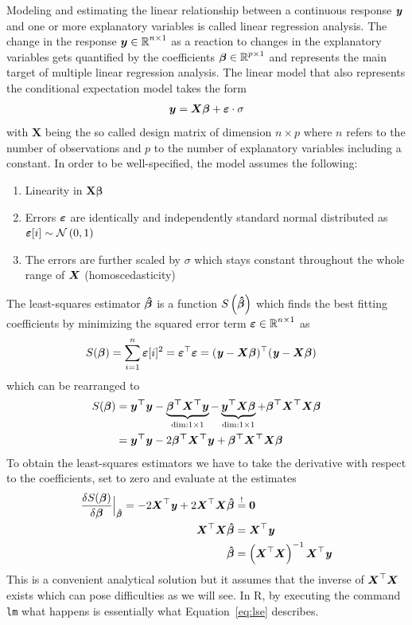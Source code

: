 \documentclass[11pt,a4paper,twoside]{book}\usepackage[]{graphicx}\usepackage[]{xcolor}
\begin{document}
Modeling and estimating the linear relationship between a continuous response ${\textbf{\textit{y}}}$ and one or more explanatory variables is called linear regression analysis. The change in the response $\boldsymbol{y}\in\operatorname{\mathbb{R}}^{n\times 1}$ as a reaction to changes in the explanatory variables gets quantified by the coefficients $\boldsymbol{\beta}\in\operatorname{\mathbb{R}}^{p\times 1}$ and represents the main target of multiple linear regression analysis. The linear model that also represents the conditional expectation model takes the form
\begin{align}
\boldsymbol{y}=\boldsymbol{X\beta}+{\boldsymbol{\varepsilon}}\cdot \sigma \label{eq:2.1}
\end{align}
with $\boldsymbol{X}$ being the so called design matrix of dimension $n\times p$ where $n$ refers to the number of observations and $p$ to the number of explanatory variables including a constant. In order to be well-specified, the model assumes the following:
\begin{enumerate}
\item Linearity in $\boldsymbol{X\beta}$
\item Errors ${\boldsymbol{\varepsilon}}$ are identically and independently standard normal distributed as ${\boldsymbol{\varepsilon}}[i]\sim\operatorname{\mathcal{N}}\left(0,1\right)$
\item The errors are further scaled by $\sigma$ which stays constant throughout the whole range of ${\boldsymbol{X}}$ (homoscedasticity) 
\end{enumerate}

The least-squares estimator ${\boldsymbol{\hat\beta}}$ is a function $S\left({\boldsymbol{\hat\beta}}\right)$ which finds the best fitting coefficients by minimizing the squared error term ${\boldsymbol{\varepsilon}}\in\operatorname{\mathbb{R}}^{n\times 1}$ as
\begin{align}
S({\boldsymbol{\beta}})&=\sum_{i=1}^{n}{\boldsymbol{\varepsilon}}[i]^2={\boldsymbol{\varepsilon}}^\top{\boldsymbol{\varepsilon}}=({\textbf{\textit{y}}}-{\boldsymbol{X}}{\boldsymbol{\beta}})^\top({\textbf{\textit{y}}}-{\boldsymbol{X}}{\boldsymbol{\beta}})
\end{align}
which can be rearranged to
\begin{align*}
S({\boldsymbol{\beta}})&=\boldsymbol{y^\top y}-\underbrace{\boldsymbol{\beta^\top X^\top y}}_{\text{dim:}1\times 1}-\underbrace{\boldsymbol{y^\top X\beta}}_{\text{dim:}1\times 1}+\boldsymbol{\beta^\top X^\top X\beta}\\
&=\boldsymbol{y^\top y}-2\boldsymbol{\beta^\top X^\top y}+\boldsymbol{\beta^\top X^\top X\beta}
\end{align*}
To obtain the least-squares estimators we have to take the derivative with respect to the coefficients, set to zero and evaluate at the estimates
\begin{align}
\frac{\delta S(\bbeta)}{\delta\boldsymbol{\beta} }\Big|_{\hbbeta} =-2\X^\top \y+2\X^\top \X\hbbeta&\stackrel{!}{=}\boldsymbol{0}\nonumber\\
\X^\top \X\hbbeta&=\X^\top \y\nonumber\\
\hbbeta&=\left(\X^\top \X\right)^{-1}\X^\top \y
\label{eq:lse}
\end{align}
This is a convenient analytical solution but it assumes that the inverse of ${\boldsymbol{X}}^\top {\boldsymbol{X}}$ exists which can pose difficulties as we will see. In \textsf{R}, by executing the command \texttt{lm} what happens is essentially what Equation~\eqref{eq:lse} describes.
\end{document}
